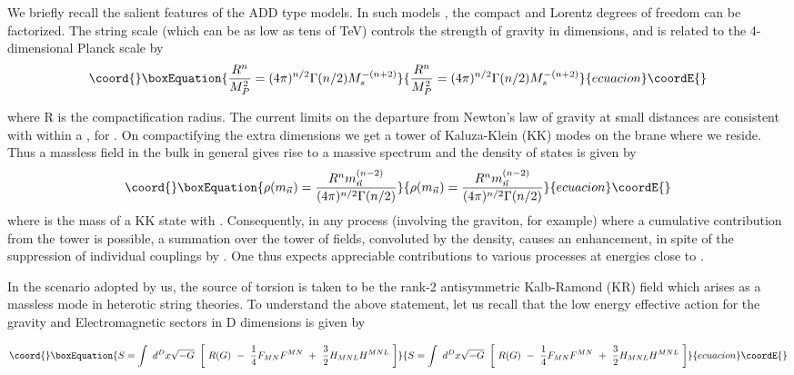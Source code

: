 \documentclass[a4paper,12pt]{article}
\begin{document}
We briefly recall the salient features of the ADD type models. In
such models \cite{add} , the compact and Lorentz degrees of
freedom can be factorized. The string scale \coordHE{} (which can be
as low as tens of TeV) controls the strength of gravity in \coordHE{}
dimensions, and is related to the 4-dimensional Planck scale
\coordHE{} by
\begin{equation}\coord{}\boxEquation{
\frac{R^n}{M_P^2} = (4\pi)^{n/2}\Gamma(n/2) M_s^{-(n+2)}
}{
\frac{R^n}{M_P^2} = (4\pi)^{n/2}\Gamma(n/2) M_s^{-(n+2)}
}{ecuacion}\coordE{}\end{equation}

\noindent where  R is the compactification radius. The current
limits on the departure from Newton's law of gravity at small
distances are consistent with \coordHE{} within a \coordHE{}, for \coordHE{}.
On compactifying the extra dimensions we get a tower of
Kaluza-Klein (KK) modes on the brane where we reside. Thus a
massless field in the bulk in general gives rise to a massive
spectrum and  the density of states is given by
\begin{equation}\coord{}\boxEquation{
\rho({m}_{\vec{n}})=\frac{R^n
{{m}_{\vec{n}}^{(n-2)}}}{(4\pi)^{n/2}\Gamma(n/2)}
}{
\rho({m}_{\vec{n}})=\frac{R^n
{{m}_{\vec{n}}^{(n-2)}}}{(4\pi)^{n/2}\Gamma(n/2)}
}{ecuacion}\coordE{}\end{equation}
where \coordHE{}
is the mass of a KK state with \coordHE{}
\cite{han}. Consequently, in any process (involving the graviton,
for example) where a cumulative contribution from the tower is
possible, a summation over the tower of fields, convoluted by the
density, causes an enhancement, in spite of the suppression of
individual couplings by \coordHE{}. One thus expects appreciable
contributions to various processes at energies close to \coordHE{}.

In the scenario adopted by us, the source of torsion is taken to
be the rank-2 antisymmetric Kalb-Ramond (KR) field \coordHE{} which
arises as a massless mode in heterotic string theories\cite{gsw}.
To understand the above statement, let us recall that the low
energy effective action for the gravity and  Electromagnetic
sectors in D dimensions is given by

\begin{equation}\coord{}\boxEquation{
S = \int~ d^{D}x \sqrt{-G} ~\left[~R(G) ~-~
    \frac{1}{4} F_{MN}F^{MN} ~+~
    \frac{3}{2} H_{MNL}H^{MNL} ~\right]
}{
S = \int~ d^{D}x \sqrt{-G} ~\left[~R(G) ~-~
    \frac{1}{4} F_{MN}F^{MN} ~+~
    \frac{3}{2} H_{MNL}H^{MNL} ~\right]
}{ecuacion}\coordE{}\end{equation}
\end{document}
